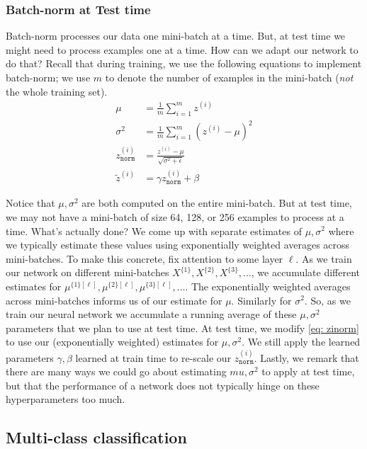 \documentclass[12pt]{article}
\begin{document}
\subsubsection{Batch-norm at Test time} Batch-norm processes our data one mini-batch at a time. But, at test time
we might need to process examples one at a time. How can we adapt our network to do that? Recall that during training,
we use the following equations to implement batch-norm; we use $m$ to denote the number of examples in the mini-batch (\emph{not} the whole training set).
\begin{align}   \mu &= \frac{1}{m}\sum_{i=1}^m z^{(i)} \nonumber \\
  \sigma^2 &= \frac{1}{m} \sum_{i=1}^m \left(z^{(i)} - \mu\right)^2 \nonumber \\
  \label{eq: zinorm}
  z^{(i)}_{\texttt{norm}} &= \frac{z^{(i)} - \mu}{\sqrt{\sigma^2 + \epsilon}} \\
  \tilde z^{(i)} &= \gamma z^{(i)}_{\texttt{norm}} + \beta \nonumber \end{align}

Notice that $\mu, \sigma^2$ are both computed on the entire mini-batch. But at test time, we may not have a mini-batch
of size 64, 128, or 256 examples to process at a time. What's actually done? We come up with separate estimates of
$\mu, \sigma^2$ where we typically estimate these values using exponentially weighted averages across mini-batches.
To make this concrete, fix attention to some layer $\ell$. As we train our network on different mini-batches $X^{\{1\}}, X^{\{2\}}, X^{\{3\}}, \ldots$, we accumulate different estimates for $\mu^{\{1\}[\ell]}, \mu^{\{2\}[\ell]}, \mu^{\{3\}[\ell]}, \ldots$. The exponentially weighted averages across mini-batches informs us of our estimate for $\mu$. Similarly for $\sigma^2$. So, as we train our neural network we accumulate a running average of these $\mu, \sigma^2$ parameters that we plan to use at test time. At test time, we modify \ref{eq: zinorm} to use our (exponentially weighted) estimates for 
$\mu, \sigma^2$. We still apply the learned parameters $\gamma, \beta$ learned at train time to re-scale our $z^{(i)}_{\texttt{norm}}$. Lastly, we remark that there are many ways we could go about estimating $mu, \sigma^2$ to apply at test time, but that the performance of a network does not typically hinge on these hyperparameters too much.

\subsection{Multi-class classification} 
\end{document}
